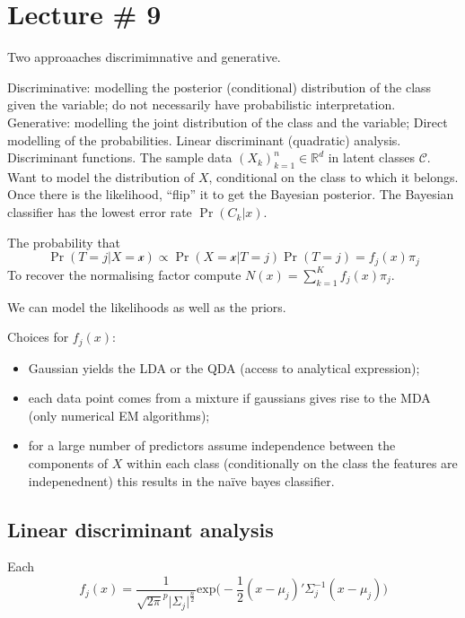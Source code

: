 \documentclass[a4paper]{article}
\newcommand{\Real}{\mathbb{R}}
\newcommand{\Ccal}{\mathcal{C}}
\begin{document}

\clearpage
\section{Lecture \# 9} %
\label{sec:lecture_9}

Two approaaches discrimimnative and generative.

Discriminative: modelling the posterior (conditional) distribution of the class given the variable; do not necessarily have probabilistic interpretation.
Generative: modelling the joint distribution of the class and the variable;
Direct modelling of the probabilities.
Linear discriminant (quadratic) analysis.
Discriminant functions.
The sample data $(X_k)_{k=1}^n\in \Real^d$ in latent classes $\Ccal$. Want to model the distribution of $X$, conditional on the class to which it belongs.
Once there is the likelihood, ``flip'' it to get the Bayesian posterior. The Bayesian classifier has the lowest error rate $\Pr(C_k\vert x)$.

The probability that 
\[\Pr(T = j\vert X = \mathcal{x}) \propto \Pr(X = \mathcal{x}\vert T = j) \Pr( T = j ) = f_j(x) \pi_j\]
To recover the normalising factor compute $N(x) = \sum_{k=1}^K f_j(x) \pi_j$.

We can model the likelihoods as well as the priors.

Choices for $f_j(x)$: \begin{itemize}
	\item Gaussian yields the LDA or the QDA (access to analytical expression);
	\item each data point comes from a mixture if gaussians gives rise to the MDA (only numerical EM algorithms);
	\item for a large number of predictors assume independence between the components of $X$ within each class (conditionally on the class the features are indepenednent) this results in the na\"ive bayes classifier.
\end{itemize}


\subsection{Linear discriminant analysis} %
\label{sub:linear_discriminant_analysis}

Each
\[f_j(x) = \frac{1}{\sqrt{2\pi}^p \lvert \Sigma_j\rvert^\frac{n}{2}} \text{exp}\bigg(-\frac{1}{2}(x-\mu_j)'\Sigma_j^{-1}(x-\mu_j)\bigg)\]
\end{document}
